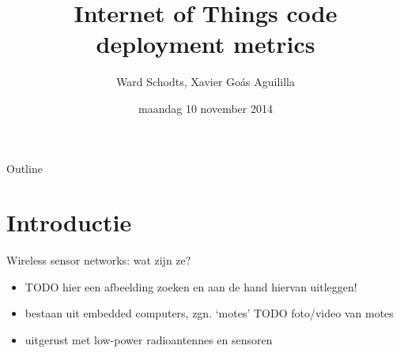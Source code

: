 \documentclass[presentation, bigger]{beamer}
\author{Ward Schodts, Xavier Goás Aguililla}
\date{maandag 10 november 2014}
\title{Internet of Things code deployment metrics}
\begin{document}
\maketitle
\begin{frame}{Outline}
\tableofcontents
\end{frame}


\section{Introductie}
\label{sec-1}
\begin{frame}[label=sec-1-1]{Wireless sensor networks: wat zijn ze?}
\begin{itemize}
\item TODO hier een afbeelding zoeken en aan de hand hiervan uitleggen!
\item bestaan uit embedded computers, zgn. ‘motes’
TODO foto/video van motes
\item uitgerust met low-power radioantennes en sensoren
\end{itemize}
\end{frame}
\end{document}
